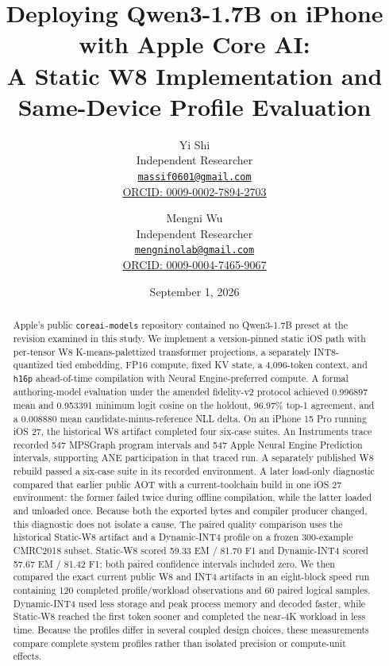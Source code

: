 \documentclass[10pt]{article}
\title{Deploying Qwen3-1.7B on iPhone with Apple Core AI:\\
A Static W8 Implementation and Same-Device Profile Evaluation}
\author{
  Yi Shi\\[-1pt]
  \small Independent Researcher\\[-1pt]
  \small\href{mailto:massif0601@gmail.com}{\nolinkurl{massif0601@gmail.com}}\\[-1pt]
  \small\href{https://orcid.org/0009-0002-7894-2703}{ORCID: 0009-0002-7894-2703}
  \and
  Mengni Wu\\[-1pt]
  \small Independent Researcher\\[-1pt]
  \small\href{mailto:mengninolab@gmail.com}{\nolinkurl{mengninolab@gmail.com}}\\[-1pt]
  \small\href{https://orcid.org/0009-0004-7465-9067}{ORCID: 0009-0004-7465-9067}
}
\date{September 1, 2026}
\DeclareRobustCommand{\evidence}[1]{}
\DeclareRobustCommand{\artifact}[1]{\nolinkurl{#1}}
\begin{document}
\maketitle

\begin{abstract}
Apple's public \artifact{coreai-models} repository contained no Qwen3-1.7B preset at the revision examined in this study.\evidence{CL-01}
We implement a version-pinned static iOS path with per-tensor W8 K-means-palettized transformer projections, a separately INT8-quantized tied embedding, FP16 compute, fixed KV state, a 4,096-token context, and \artifact{h16p} ahead-of-time compilation with Neural Engine-preferred compute.\evidence{CL-03,CL-04,CL-05}
A formal authoring-model evaluation under the amended fidelity-v2 protocol achieved 0.996897 mean and 0.953391 minimum logit cosine on the holdout, 96.97\% top-1 agreement, and a 0.008880 mean candidate-minus-reference NLL delta.\evidence{CL-06,CL-07}
On an iPhone 15 Pro running iOS 27, the historical W8 artifact completed four six-case suites. An Instruments trace recorded 547 MPSGraph program intervals and 547 Apple Neural Engine Prediction intervals, supporting ANE participation in that traced run.\evidence{CL-08,CL-09}
A separately published W8 rebuild passed a six-case suite in its recorded environment. A later load-only diagnostic compared that earlier public AOT with a current-toolchain build in one iOS 27 environment: the former failed twice during offline compilation, while the latter loaded and unloaded once. Because both the exported bytes and compiler producer changed, this diagnostic does not isolate a cause.\evidence{CL-10,CL-22,CL-28}
The paired quality comparison uses the historical Static-W8 artifact and a Dynamic-INT4 profile on a frozen 300-example CMRC2018 subset.\evidence{CL-11,CL-12}
Static-W8 scored 59.33 EM / 81.70 F1 and Dynamic-INT4 scored 57.67 EM / 81.42 F1; both paired confidence intervals included zero.\evidence{CL-13,CL-14}
We then compared the exact current public W8 and INT4 artifacts in an eight-block speed run containing 120 completed profile/workload observations and 60 paired logical samples. Dynamic-INT4 used less storage and peak process memory and decoded faster, while Static-W8 reached the first token sooner and completed the near-4K workload in less time.\evidence{CL-15,CL-16,CL-17,CL-18,CL-19,CL-20}
Because the profiles differ in several coupled design choices, these measurements compare complete system profiles rather than isolated precision or compute-unit effects.
\end{abstract}
\end{document}
